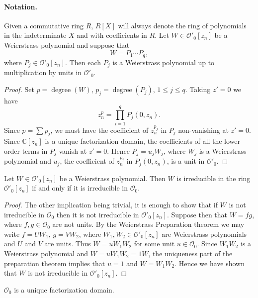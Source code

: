 \paragraph*{Notation.} Given a commutative ring $R$, $R[X]$ will always denote the ring of polynomials in the indeterminate $X$ and with coefficients in $R$.
 Let $W\in\mathcal O'_0[z_n]$ be a Weierstrass polynomial and suppose that
\[W=P_1\cdots P_q,\]
where $P_j\in\mathcal O'_0[z_n]$. Then each $P_j$ is a Weierstrass polynomial up to multiplication by units in $\mathcal O'_0$.
\begin{proof}
Set $p=\operatorname{degree}(W)$, $p_j=\operatorname{degree}(P_j)$, $1\leq j\leq q$. Taking $z'=0$ we have
\[z_n^p=\prod_{i=1}^q P_j(0,z_n).\]
Since $p=\sum p_j$, we must have the coefficient of $z_n^{p_j}$ in $P_j$ non-vanishing at $z'=0$. Since $\mathbb C[z_n]$ is a unique factorization domain, the coefficients of all the lower order terms in $P_j$ vanish at $z'=0$. Hence $P_j=u_jW_j$, where $W_j$ is a Weierstrass polynomial and $u_j$, the coefficient of $z_n^{p_j}$ in $P_j(0,z_n)$, is a unit in $\mathcal O'_0$.
\end{proof}
 Let $W\in\mathcal O'_0[z_n]$ be a Weierstrass polynomial. Then $W$ is irreducible in the ring $\mathcal O'_0[z_n]$ if and only if it is irreducible in $\mathcal O_0$.
\begin{proof}
The other implication being trivial, it is enough to show that if $W$ is not irreducible in $\mathcal O_0$ then it is not irreducible in $\mathcal O'_0[z_n]$. Suppose then that $W=fg$, where $f,g\in\mathcal O_0$ are not units. By the Weierstrass Preparation theorem we may write $f=UW_1$, $g=VW_2$, where $W_1,W_2\in\mathcal O'_0[z_n]$ are Weierstrass polynomials and $U$ and $V$ are units. Thus $W=uW_1W_2$ for some unit $u\in\mathcal O_0$. Since $W_1W_2$ is a Weierstrass polynomial and $W=uW_1W_2=1W$, the uniqueness part of the preparation theorem implies that $u=1$ and $W=W_1W_2$. Hence we have shown that $W$ is not irreducible in $\mathcal O'_0[z_n]$.
\end{proof}
 $\mathcal O_0$ is a unique factorization domain.
